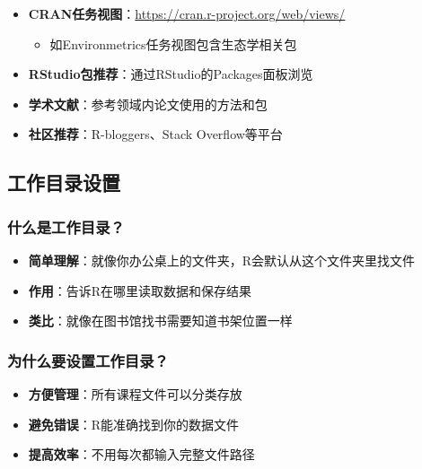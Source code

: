\documentclass[
]{book}
\providecommand{\tightlist}{%
  \setlength{\itemsep}{0pt}\setlength{\parskip}{0pt}}
\begin{document}
\begin{itemize}
\tightlist
\item
  \textbf{CRAN任务视图}：\url{https://cran.r-project.org/web/views/}

  \begin{itemize}
  \tightlist
  \item
    如Environmetrics任务视图包含生态学相关包
  \end{itemize}
\item
  \textbf{RStudio包推荐}：通过RStudio的Packages面板浏览
\item
  \textbf{学术文献}：参考领域内论文使用的方法和包
\item
  \textbf{社区推荐}：R-bloggers、Stack Overflow等平台
\end{itemize}

\hypertarget{ux5de5ux4f5cux76eeux5f55ux8bbeux7f6e}{%
\subsection{工作目录设置}\label{ux5de5ux4f5cux76eeux5f55ux8bbeux7f6e}}

\hypertarget{ux4ec0ux4e48ux662fux5de5ux4f5cux76eeux5f55}{%
\subsubsection{什么是工作目录？}\label{ux4ec0ux4e48ux662fux5de5ux4f5cux76eeux5f55}}

\begin{itemize}
\tightlist
\item
  \textbf{简单理解}：就像你办公桌上的文件夹，R会默认从这个文件夹里找文件
\item
  \textbf{作用}：告诉R在哪里读取数据和保存结果
\item
  \textbf{类比}：就像在图书馆找书需要知道书架位置一样
\end{itemize}

\hypertarget{ux4e3aux4ec0ux4e48ux8981ux8bbeux7f6eux5de5ux4f5cux76eeux5f55}{%
\subsubsection{为什么要设置工作目录？}\label{ux4e3aux4ec0ux4e48ux8981ux8bbeux7f6eux5de5ux4f5cux76eeux5f55}}

\begin{itemize}
\tightlist
\item
  \textbf{方便管理}：所有课程文件可以分类存放
\item
  \textbf{避免错误}：R能准确找到你的数据文件
\item
  \textbf{提高效率}：不用每次都输入完整文件路径
\end{itemize}
\end{document}
